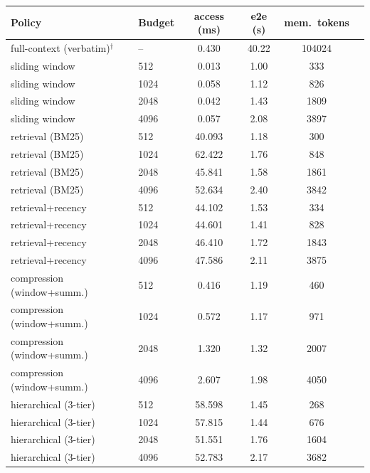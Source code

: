 \begin{tabular}{llcccc}
\toprule
Policy & Budget & access (ms) & e2e (s) & mem.\ tokens \\
\midrule
full-context (verbatim)$^{\dagger}$ & -- & 0.430 & 40.22 & 104024 \\
sliding window & 512 & 0.013 & 1.00 & 333 \\
sliding window & 1024 & 0.058 & 1.12 & 826 \\
sliding window & 2048 & 0.042 & 1.43 & 1809 \\
sliding window & 4096 & 0.057 & 2.08 & 3897 \\
retrieval (BM25) & 512 & 40.093 & 1.18 & 300 \\
retrieval (BM25) & 1024 & 62.422 & 1.76 & 848 \\
retrieval (BM25) & 2048 & 45.841 & 1.58 & 1861 \\
retrieval (BM25) & 4096 & 52.634 & 2.40 & 3842 \\
retrieval+recency & 512 & 44.102 & 1.53 & 334 \\
retrieval+recency & 1024 & 44.601 & 1.41 & 828 \\
retrieval+recency & 2048 & 46.410 & 1.72 & 1843 \\
retrieval+recency & 4096 & 47.586 & 2.11 & 3875 \\
compression (window+summ.) & 512 & 0.416 & 1.19 & 460 \\
compression (window+summ.) & 1024 & 0.572 & 1.17 & 971 \\
compression (window+summ.) & 2048 & 1.320 & 1.32 & 2007 \\
compression (window+summ.) & 4096 & 2.607 & 1.98 & 4050 \\
hierarchical (3-tier) & 512 & 58.598 & 1.45 & 268 \\
hierarchical (3-tier) & 1024 & 57.815 & 1.44 & 676 \\
hierarchical (3-tier) & 2048 & 51.551 & 1.76 & 1604 \\
hierarchical (3-tier) & 4096 & 52.783 & 2.17 & 3682 \\
\bottomrule
\end{tabular}